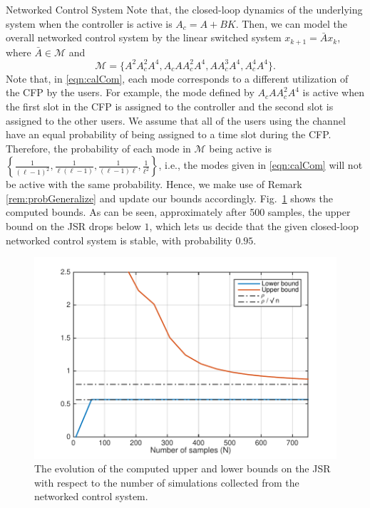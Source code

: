\begin{subsection}{Networked Control System}
Note that, the closed-loop dynamics of the underlying system when the controller is active is $A_c = A+BK$. Then, we can model the overall networked control system by the linear switched system $x_{k+1} = \bar{A}x_k$, where $\bar{A} \in \mathcal{M}$ and
\begin{equation}\label{eqn:calCom}\mathcal{M} = \{A^2A_c^2A^4, A_cAA_c^2A^4,AA_c^3A^4, A_c^4A^4\}.
\end{equation}
Note that, in \eqref{eqn:calCom}, each mode corresponds to a different utilization of the CFP by the users. For example, the mode defined by $A_cAA_c^2A^4$ is active when the first slot in the CFP is assigned to the controller and the second slot is assigned to the other users. We assume that all of the users using the channel have an equal probability of being assigned to a time slot during the CFP. Therefore, the probability of each mode in $\mathcal{M}$ being active is $\left\{\frac{1}{(\ell-1)^2}, \frac{1}{\ell(\ell-1)}, \frac{1}{(\ell-1)\ell}, \frac{1}{\ell^2}\right\}$, i.e., the modes given in \eqref{eqn:calCom} will not be active with the same probability. Hence, we make use of Remark \ref{rem:probGeneralize} and update our bounds accordingly. Fig.~\ref{fig:4} shows the computed bounds. As can be seen, approximately after 500 samples,  the upper bound on the JSR drops below $1$, which lets us decide that the given closed-loop networked control system is stable, with probability $0.95$.

\begin{figure}
    \centering
        \includegraphics[scale=0.7]{networkControl.pdf}
    \caption{The evolution of the computed upper and lower bounds on the JSR with respect to the number of simulations collected from the networked control system.}
        \label{fig:4}
\end{figure}

\end{subsection}